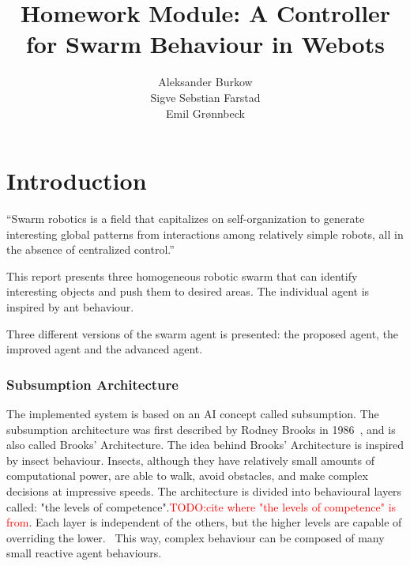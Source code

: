 \documentclass[a4paper]{article}
\title{Homework Module: A Controller for Swarm Behaviour in Webots}
\author{
    Aleksander Burkow \\
    Sigve Sebstian Farstad \\
    Emil Grønnbeck
}
\newcommand\TODO[1]{\textcolor{red}{TODO:#1}}
\newcommand\todo[1]{\TODO{#1}}
\begin{document}

\maketitle
\thispagestyle{empty}


\newpage

\tableofcontents

\newpage
\setcounter{page}{1}

\part{Introduction}
\label{part:proposed-system}

``Swarm robotics is a field that capitalizes on self-organization to generate interesting global patterns from interactions among relatively simple robots, all in the absence of centralized control.''~\cite{course-page}

This report presents three homogeneous robotic swarm that can identify interesting objects and push them to desired areas.
The individual agent is inspired by ant behaviour.

Three different versions of the swarm agent is presented: the proposed agent, the improved agent and the advanced agent.



\section{Subsumption Architecture}
The implemented system is based on an AI concept called subsumption.
The subsumption architecture was first described by Rodney Brooks in 1986~\cite{brooks}, and is also called Brooks' Architecture.
The idea behind Brooks' Architecture is inspired by insect behaviour.
Insects, although they have relatively small amounts of computational power, are able to walk, avoid obstacles, and make complex decisions at impressive speeds.
The architecture is divided into behavioural layers called: "the levels of competence".\todo{cite where "the levels of competence" is from}.
Each layer is independent of the others, but the higher levels are capable of overriding the lower.~\cite{mwarnerwu}
This way, complex behaviour can be composed of many small reactive agent behaviours.
\end{document}
